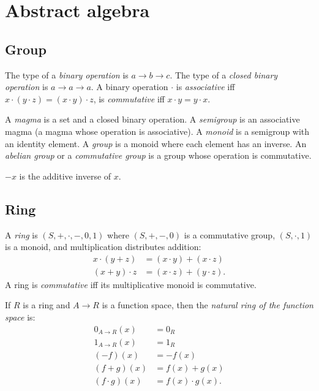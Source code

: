\chapter{Abstract algebra}

\section{Group}

%
The type of a \emph{binary operation} is \(a \to b \to c\).
%
%
The type of a \emph{closed binary operation} is \(a \to a \to a\).
A binary operation \(\cdot\)
is \emph{associative} iff \(x\cdot(y\cdot z) = (x\cdot y)\cdot z\),
is \emph{commutative} iff \(x \cdot y = y \cdot x\).

%
A \emph{magma} is a set and a closed binary operation.
%
A \emph{semigroup} is an associative magma (a magma whose operation is associative).
%
A \emph{monoid} is a semigroup with an identity element.
%
A \emph{group} is a monoid where each element has an inverse.
%
%
%
An \emph{abelian group} or a \emph{commutative group}
is a group whose operation is commutative.

\(-x\) is the additive inverse of \(x\).

\section{Ring}

A
%
\emph{ring} is \((S,+,\cdot,-,0,1)\) where
\((S,+,-,0)\) is a commutative group,
\((S,\cdot,1)\) is a monoid,
and multiplication distributes addition:
\begin{align*}
    x \cdot (y+z) &= (x \cdot y) + (x \cdot z)
    \\
    (x+y) \cdot z &= (x \cdot z) + (y \cdot z).
\end{align*}
A ring is
%
%
\emph{commutative} iff its multiplicative monoid is commutative.

If \(R\) is a ring and \(A \to R\) is a function space,
then the \emph{natural ring of the function space} is:
\begin{align*}
    0_{A\to R}(x) &= 0_R
    \\ 1_{A\to R}(x) &= 1_R
    \\ (- f)(x) &= - f(x)
    \\ (f + g)(x) &= f(x) + g(x)
    \\ (f \cdot g)(x) &= f(x) \cdot g(x).
\end{align*}

